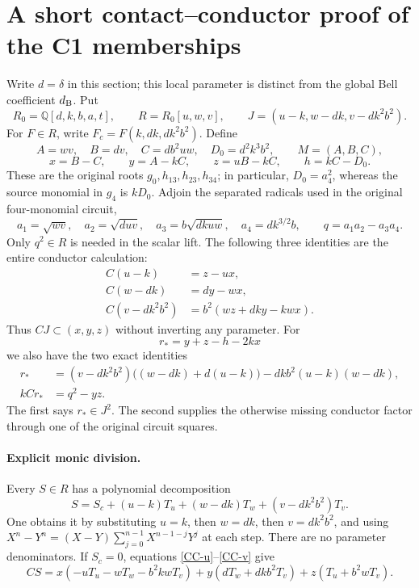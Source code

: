 \section{A short contact--conductor proof of the C1 memberships}

Write $d=\delta$ in this section; this local parameter is distinct from
the global Bell coefficient $d_{\rm B}$. Put
\[
 R_0=\mathbb Q[d,k,b,a,t],\qquad R=R_0[u,w,v],\qquad
 J=(u-k,w-dk,v-dk^2b^2).
\]
For $F\in R$, write $F_c=F(k,dk,dk^2b^2)$. Define
\[
 A=wv,\quad B=dv,\quad C=db^2uw,\quad D_0=d^2k^3b^2,
 \qquad M=(A,B,C),
\]
\[
 x=B-C,\qquad y=A-kC,\qquad z=uB-kC,\qquad h=kC-D_0.
\]
These are the original roots $g_0,h_{13},h_{23},h_{34}$; in particular,
$D_0=a_4^2$, whereas the source monomial in $g_4$ is $kD_0$.
Adjoin the separated radicals used in the original four-monomial circuit,
\[
 a_1=\sqrt{wv},\quad a_2=\sqrt{duv},\quad
 a_3=b\sqrt{dkuw},\quad a_4=dk^{3/2}b,
 \qquad q=a_1a_2-a_3a_4.
\]
Only $q^2\in R$ is needed in the scalar lift. The following three identities
are the entire conductor calculation:
\begin{align}
 C(u-k)&=z-ux,\label{CC-u}\\
 C(w-dk)&=dy-wx,\label{CC-w}\\
 C(v-dk^2b^2)&=b^2(wz+dky-kwx).\label{CC-v}
\end{align}
Thus $CJ\subset(x,y,z)$ without inverting any parameter.
For
\[
 r_*=y+z-h-2kx
\]
we also have the two exact identities
\begin{align}
 r_*&=(v-dk^2b^2)\bigl((w-dk)+d(u-k)\bigr)
       -dkb^2(u-k)(w-dk),\label{CC-star}\\
 kCr_*&=q^2-yz.\label{CC-repair}
\end{align}
The first says $r_*\in J^2$. The second supplies the otherwise missing
conductor factor through one of the original circuit squares.

\paragraph{Explicit monic division.}
Every $S\in R$ has a polynomial decomposition
\[
 S=S_c+(u-k)T_u+(w-dk)T_w+(v-dk^2b^2)T_v.                 \tag{CC1}
\]
One obtains it by substituting $u=k$, then $w=dk$, then $v=dk^2b^2$,
and using $X^n-Y^n=(X-Y)\sum_{j=0}^{n-1}X^{n-1-j}Y^j$ at each step.
There are no parameter denominators. If $S_c=0$, equations
\eqref{CC-u}--\eqref{CC-v} give
\[
 CS=x(-uT_u-wT_w-b^2kwT_v)
     +y(dT_w+dkb^2T_v)+z(T_u+b^2wT_v).                 \tag{CC2}
\]

